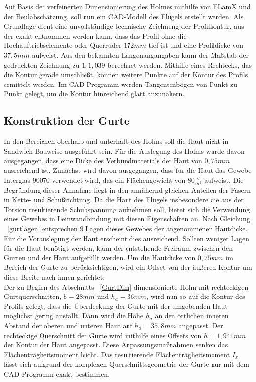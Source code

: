 Auf Basis der verfeinerten Dimensionierung des Holmes mithilfe von ELamX und der Beulabschätzung, soll nun ein CAD-Modell des Flügels erstellt werden. Als Grundlage dient eine unvollständige technische Zeichnung der Profilkontur, aus der exakt entnommen werden kann, dass das Profil ohne die Hochauftriebselemente oder Querruder $ 172mm $ tief ist und eine Profildicke von $ 37,5mm $ aufweist. Aus den bekannten Längenangangaben kann der Maßstab der gedruckten Zeichnung zu $ 1:1,039 $ berechnet werden. Mithilfe eines Rechtecks, das die Kontur gerade umschließt, können weitere Punkte auf der Kontur des Profils ermittelt werden. Im CAD-Programm werden Tangentenbögen von Punkt zu Punkt gelegt, um die Kontur hinreichend glatt anzunähern.\\

\subsection{Konstruktion der Gurte}
\noindent In den Bereichen oberhalb und unterhalb des Holms soll die Haut nicht in Sandwich-Bauweise ausgeführt sein. Für die Auslegung des Holms wurde davon ausgegangen, dass eine Dicke des Verbundmaterials der Haut von $ 0,75mm $ ausreichend ist. Zunächst wird davon ausgegangen, dass für die Haut das Gewebe Interglas 90070 verwendet wird, das ein Flächengewicht von $ 80\frac{g}{m^{2}} $ aufweist. Die Begründung dieser Annahme liegt in den annähernd gleichen Anteilen der Fasern in Kette- und Schußrichtung. Da die Haut des Flügels insbesondere die aus der Torsion resultierende Schubspannung aufnehmen soll, bietet sich die Verwendung eines Gewebes in Leinwandbindung mit diesen Eigenschaften an. Nach Gleichung ~\ref{gurtlagen} entsprechen $ 9 $ Lagen dieses Gewebes der angenommenen Hautdicke. Für die Vorauslegung der Haut erscheint dies ausreichend. Sollten weniger Lagen für die Haut benötigt werden, kann der entstehende Freiraum zwischen den Gurten und der Haut aufgefüllt werden. Um die Hautdicke von $ 0,75mm $ im Bereich der Gurte zu berücksichtigen, wird ein Offset von der äußeren Kontur um diese Breite nach innen gerichtet.\\
\noindent Der zu Beginn des Abschnitts ~\ref{GurtDim} dimensionierte Holm mit rechteckigen Gurtquerschnitten, $ b=28mm $ und $ h_{a}=36mm $, wird nun so auf die Kontur des Profils gelegt, dass die Überdeckung der Gurte mit der umgebenden Haut möglichst gering ausfällt. Dann wird die Höhe $ h_{a} $ an den örtlichen inneren Abstand der oberen und unteren Haut auf $ {h_{a}}=35,8mm $ angepasst. Der rechteckige Querschnitt der Gurte wird mithilfe eines Offsets von $ {h}=1,941mm $ der Kontur der Haut angepasst. Diese Anpassungsmaßnahmen senken das Flächenträgheitsmoment leicht. Das resultierende Flächenträgheitsmoment $ {I_{x}} $ lässt sich aufgrund der komplexen Querschnittsgeometrie der Gurte nur mit dem CAD-Programm exakt bestimmen. 
